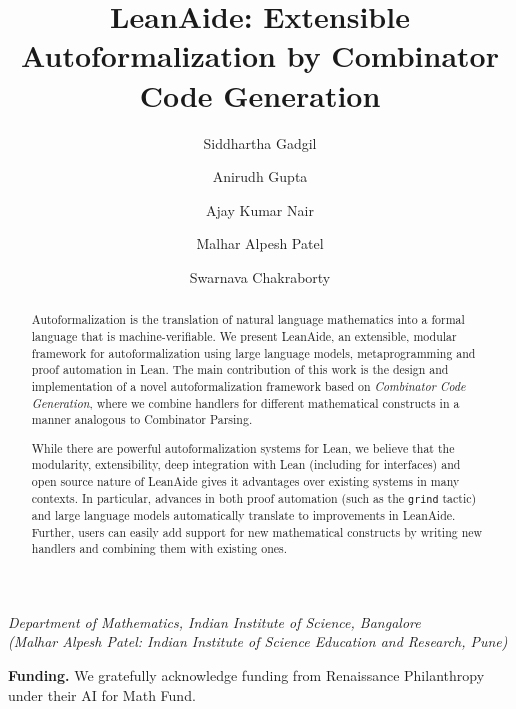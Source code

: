 \documentclass[11pt]{article}
\title{LeanAide: Extensible Autoformalization by Combinator Code Generation}
\author{
  Siddhartha Gadgil \and
  Anirudh Gupta \and
  Ajay Kumar Nair \and
  Malhar Alpesh Patel \and
  Swarnava Chakraborty
}
\date{}
\begin{document}
\maketitle

\begin{center}
\emph{Department of Mathematics, Indian Institute of Science, Bangalore \\
(Malhar Alpesh Patel: Indian Institute of Science Education and Research, Pune)}
\end{center}

\begin{abstract}
Autoformalization is the translation of natural language mathematics into a
formal language that is machine-verifiable. We present LeanAide, an
extensible, modular framework for autoformalization using large language
models, metaprogramming and proof automation in Lean. The main contribution
of this work is the design and implementation of a novel autoformalization
framework based on \emph{Combinator Code Generation}, where we combine
handlers for different mathematical constructs in a manner analogous to
Combinator Parsing.

While there are powerful autoformalization systems for Lean, we believe that
the modularity, extensibility, deep integration with Lean (including for
interfaces) and open source nature of LeanAide gives it advantages over
existing systems in many contexts. In particular, advances in both proof
automation (such as the \texttt{grind} tactic) and large language models
automatically translate to improvements in LeanAide. Further, users can
easily add support for new mathematical constructs by writing new handlers
and combining them with existing ones.
\end{abstract}

\noindent\textbf{Funding.} We gratefully acknowledge funding from Renaissance
Philanthropy under their AI for Math Fund.
\end{document}

